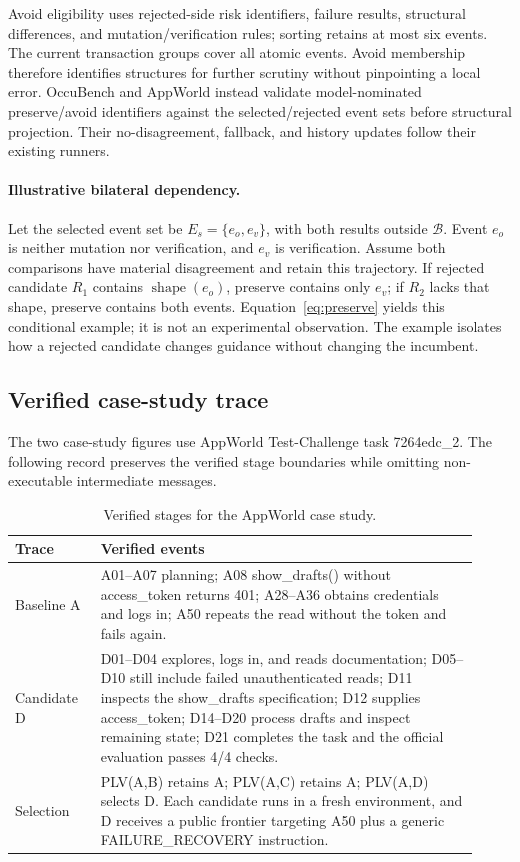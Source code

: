 \documentclass{article}
\newcommand{\api}[1]{\textnormal{#1}}
\begin{document}
Avoid eligibility uses rejected-side risk identifiers, failure results, structural differences, and mutation/verification rules; sorting retains at most six events. The current transaction groups cover all atomic events. Avoid membership therefore identifies structures for further scrutiny without pinpointing a local error. OccuBench and AppWorld instead validate model-nominated preserve/avoid identifiers against the selected/rejected event sets before structural projection. Their no-disagreement, fallback, and history updates follow their existing runners.

\paragraph{Illustrative bilateral dependency.}
Let the selected event set be $E_s=\{e_o,e_v\}$, with both results outside $\mathcal{B}$. Event $e_o$ is neither mutation nor verification, and $e_v$ is verification. Assume both comparisons have material disagreement and retain this trajectory. If rejected candidate $R_1$ contains $\operatorname{shape}(e_o)$, preserve contains only $e_v$; if $R_2$ lacks that shape, preserve contains both events. Equation~\ref{eq:preserve} yields this conditional example; it is not an experimental observation. The example isolates how a rejected candidate changes guidance without changing the incumbent.

\subsection{Verified case-study trace}
\label{app:case-study}
The two case-study figures use AppWorld Test-Challenge task \api{7264edc\_2}. The following record preserves the verified stage boundaries while omitting non-executable intermediate messages.
\begin{table}[!htb]
\centering
\scriptsize
\caption{Verified stages for the AppWorld case study.}
\label{tab:case-study-trace}
\begin{tabular}{p{0.17\linewidth}p{0.75\linewidth}}
\toprule
Trace & Verified events \\
\midrule
Baseline A & A01--A07 planning; A08 \api{show\_drafts()} without \api{access\_token} returns 401; A28--A36 obtains credentials and logs in; A50 repeats the read without the token and fails again. \\
Candidate D & D01--D04 explores, logs in, and reads documentation; D05--D10 still include failed unauthenticated reads; D11 inspects the \api{show\_drafts} specification; D12 supplies \api{access\_token}; D14--D20 process drafts and inspect remaining state; D21 completes the task and the official evaluation passes 4/4 checks. \\
Selection & PLV(A,B) retains A; PLV(A,C) retains A; PLV(A,D) selects D. Each candidate runs in a fresh environment, and D receives a public frontier targeting A50 plus a generic \api{FAILURE\_RECOVERY} instruction. \\
\bottomrule
\end{tabular}
\end{table}
\end{document}
